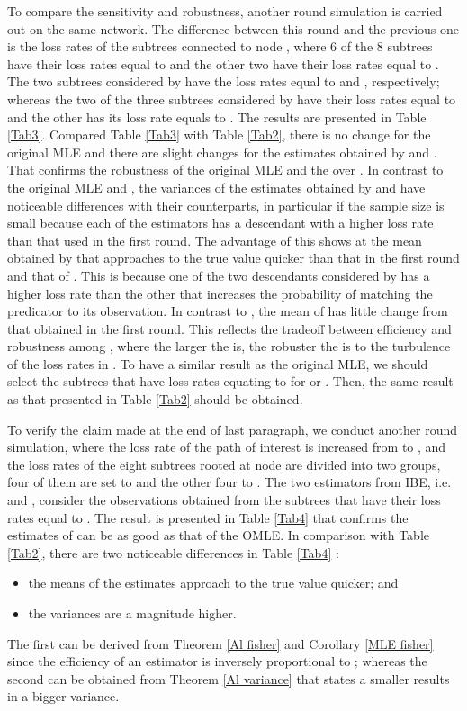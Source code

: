 \documentclass[10pt,onecolumn]{IEEEtran}
\begin{document}
To compare the sensitivity and robustness, another round simulation is carried out on the same network.
 The difference between this round and the previous one is the loss rates of the subtrees connected to node , where 6 of the 8 subtrees have their loss rates equal to  and the other two have their loss rates equal to . The two subtrees
  considered by  have the loss rates equal to  and , respectively; whereas the two of the three subtrees considered by  have their loss rates equal to  and the other has its loss rate equals to . The results are presented in Table \ref{Tab3}. Compared Table \ref{Tab3} with Table \ref{Tab2}, there is no change for the original MLE and there are slight changes for the estimates obtained by  and . That confirms the robustness of the original MLE and the  over . In contrast to the original MLE and , the variances of the estimates obtained by  and   have noticeable differences with their counterparts, in particular  if the sample size is small because each of the estimators has a descendant with a higher loss rate than that used in the first round.  The advantage of this shows at the mean obtained by  that
 approaches to the true value quicker than that in the first round and that of .  This is because one of the two descendants considered by  has a higher loss rate than the other that increases the probability of  matching the predicator to its observation. In contrast to , the mean of  has little change from that obtained in the first round. This reflects the tradeoff between efficiency and robustness among , where the larger the  is, the robuster the  is to the turbulence of the loss rates in . 
 To have a similar result as the original MLE, we should select  the subtrees that have loss rates equating to  for  or . Then, the same result as that presented in Table \ref{Tab2} should be obtained.

To verify the claim made at the end of last paragraph, we  conduct another round simulation, where the loss rate of the path of interest is increased from  to , and the loss rates of the eight subtrees rooted at node  are divided into two groups, four of them are set to  and the other four to .  The two estimators from IBE, i.e.  and , consider the observations obtained from the subtrees that have their loss rates equal to . The result is presented in Table \ref{Tab4} that confirms the estimates of  can be as good as that of the OMLE.  In comparison with
Table \ref{Tab2}, there are two noticeable differences in Table \ref{Tab4} :
 \begin{itemize}
 \item the means of the estimates approach to the true value quicker; and
 \item the  variances are a magnitude higher.
  \end{itemize}
The first can be derived from Theorem \ref{Al fisher}  and Corollary \ref{MLE fisher} since the efficiency of an estimator is inversely proportional to ; whereas the second can be obtained from  Theorem \ref{Al variance} that states a smaller  results in a bigger variance.
\end{document}
